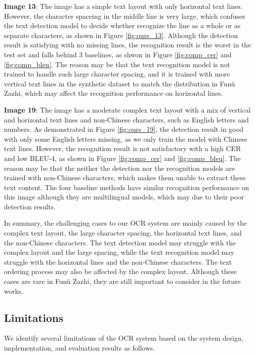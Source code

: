 \documentclass[12pt,twoside]{report}
\begin{document}
\textbf{Image 13}: The image has a simple text layout with only horizontal text lines. However, the character spaceing in the middle line is very large, which confuses the text detection model to decide whether recognize the line as a whole or as separate characters, as shown in Figure \ref{fig:ours_13}. Although the detection result is satisfying with no missing lines, the recognition result is the worst in the test set and falls behind 3 baselines, as shwon in Figure \ref{fig:comp_cer} and \ref{fig:comp_bleu}. The reason may be that the text recognition model is not trained to handle such large character spacing, and it is trained with more vertical text lines in the synthetic dataset to match the distribution in Funü Zazhi, which may affect the recognition performance on horizontal lines.

\textbf{Image 19}: The image has a moderate complex text layout with a mix of vertical and horizontal text lines and non-Chinese characters, such as English letters and numbers. As demonstrated in Figure \ref{fig:ours_19}, the detection result in good with only some English letters missing, as we only train the model with Chinese text lines. However, the recognition result is not satisfactory with a high CER and low BLEU-4, as shown in Figure \ref{fig:comp_cer} and \ref{fig:comp_bleu}. The reason may be that the neither the detection nor the recognition models are trained with non-Chinese characters, which makes them unable to extract these text content. The four baseline methods have similar recognition performance on this image although they are multilingual models, which may due to their poor detection results.

In summary, the challenging cases to our OCR system are mainly caused by the complex text layout, the large character spacing, the horizontal text lines, and the non-Chinese characters. The text detection model may struggle with the complex layout and the large spacing, while the text recognition model may struggle with the horizontal lines and the non-Chinese characters. The text ordering process may also be affected by the complex layout. Although these cases are rare in Funü Zazhi, they are still important to consider in the future works.

\subsection{Limitations}
\label{sec:limitations}
We identify several limitations of the OCR system based on the system design, implementation, and evaluation results as follows.
\end{document}
